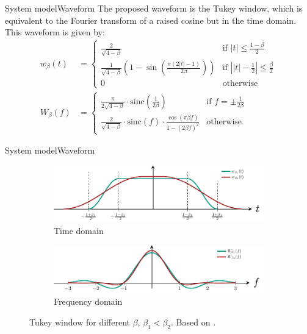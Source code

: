 \documentclass[en]{sdqbeamer}
\begin{document}
\begin{frame}{System model}{Waveform}
The proposed waveform is the Tukey window, which is equivalent to the Fourier transform of a raised cosine but in the time domain.
This waveform is given by:
\begin{align}
	w_\beta(t)&=\left\{
\begin{array}{ll}
 \frac{2}{\sqrt{4-\beta}} & \text{if } |t|\leq\frac{1-\beta}{2}\\
 \frac{1}{\sqrt{4-\beta}}\left(1-\sin\left(\frac{\pi(2|t|-1)}{2\beta}\right)\right)&\text{if } \left||t|-\frac{1}{2}\right|\leq\frac{\beta}{2}\\
  0&\text{otherwise}  
\end{array}
\right.
\label{eq:Tukey_window_TD}\\
W_\beta(f)&=\left\{
\begin{array}{ll}
  \frac{\pi}{2\sqrt{4-\beta}}\cdot\text{sinc}\left(\frac{1}{2\beta}\right)&\text{if } f=\pm\frac{1}{2\beta}\\
  \frac{2}{\sqrt{4-\beta}}\cdot\text{sinc}(f)\cdot\frac{\cos(\pi\beta f)}{1-(2\beta f)^2}&\text{otherwise}   
\end{array}
\right.
\label{eq:Tukey_window_FD}
\end{align}



\end{frame}

\begin{frame}{System model}{Waveform}

\begin{figure}[htb]
     \centering
     \begin{subfigure}[b]{0.5\textwidth}
         \centering
         \includegraphics[width=\textwidth]{Tukey_window_TD.pdf}
         \caption{Time domain}
         \label{fig:Tukey_window_TD}
     \end{subfigure}
     \hfill
     \begin{subfigure}[b]{0.5\textwidth}
         \centering
         \includegraphics[width=\textwidth]{Tukey_window_FD.pdf}
         \caption{Frequency domain}
         \label{fig:Tukey_window_FD}
     \end{subfigure}
     \hfill
     \caption{Tukey window for different $\beta$, $\beta_1<\beta_2$. Based on .}
     \label{fig:Tukey_window}
\end{figure}


\end{frame}
\end{document}
